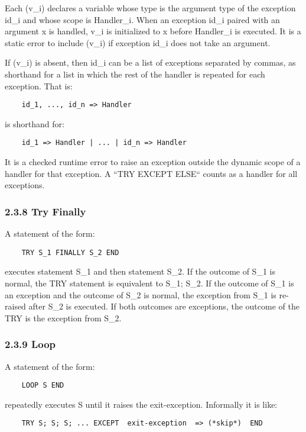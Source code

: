 \documentclass[10pt]{article}
\begin{document}
 Each (v\_i) declares a variable whose type is the argument type of the exception id\_i and whose scope is Handler\_i. When an exception id\_i paired with an argument x is handled, v\_i is initialized to x before Handler\_i is executed. It is a static error to include (v\_i) if exception id\_i does not take an argument. 


  If (v\_i) is absent, then id\_i can be a list of exceptions separated by commas, as shorthand for a list in which the rest of the handler is repeated for each exception. That is: 
\begin{verbatim}
    id_1, ..., id_n => Handler
\end{verbatim}
 is shorthand for: 
\begin{verbatim}
    id_1 => Handler | ... | id_n => Handler
\end{verbatim}



 It is a checked runtime error to raise an exception outside the dynamic scope of a handler for that exception. A ``TRY EXCEPT ELSE`` counts as a handler for all exceptions. 


 
\subsubsection*{2.3.8 Try Finally}


  A statement of the form: 
\begin{verbatim}
    TRY S_1 FINALLY S_2 END
\end{verbatim}
 executes statement S\_1 and then statement S\_2. If the outcome of S\_1 is normal, the TRY statement is equivalent to S\_1; S\_2. If the outcome of  S\_1 is an exception and the outcome of S\_2 is normal, the exception from S\_1 is re-raised after S\_2 is executed. If both outcomes are exceptions, the outcome of the TRY is the exception from S\_2. 


 
\subsubsection*{2.3.9 Loop}


  A statement of the form: 
\begin{verbatim}
    LOOP S END
\end{verbatim}
 repeatedly executes S until it raises the exit-exception. Informally it is like: 
\begin{verbatim}
    TRY S; S; S; ... EXCEPT  exit-exception  => (*skip*)  END
\end{verbatim}
\end{document}

